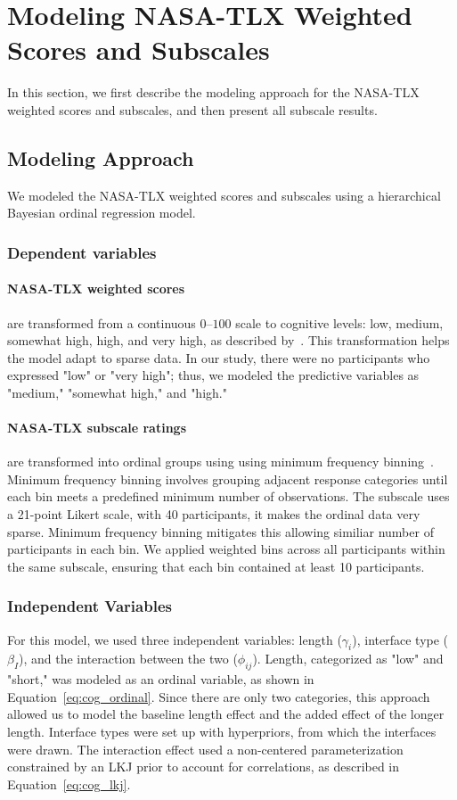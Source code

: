 \section{Modeling NASA-TLX Weighted Scores and Subscales}
In this section, we first describe the modeling approach for the NASA-TLX weighted scores and subscales, and then present all subscale results.

\subsection{Modeling Approach}
We modeled the NASA-TLX weighted scores and subscales using a hierarchical Bayesian ordinal regression model. 

\subsubsection{Dependent variables}
\paragraph{NASA-TLX weighted scores} are transformed from a continuous $0$–$100$ scale to cognitive levels: low, medium, somewhat high, high, and very high, as described by~\textcite{hart1988development}. This transformation helps the model adapt to sparse data. In our study, there were no participants who expressed "low" or "very high"; thus, we modeled the predictive variables as "medium," "somewhat high," and "high."

\paragraph{NASA-TLX subscale ratings} are transformed into ordinal groups using using minimum frequency binning~\cite{frank2001simple}. Minimum frequency binning involves grouping adjacent response categories until each bin meets a predefined minimum number of observations. The subscale uses a 21-point Likert scale, with 40 participants, it makes the ordinal data very sparse. Minimum frequency binning mitigates this allowing similiar number of participants in each bin. We applied weighted bins across all participants within the same subscale, ensuring that each bin contained at least 10 participants.

\subsubsection{Independent Variables}
For this model, we used three independent variables: length ($\gamma_i$), interface type ($\beta_I$), and the interaction between the two ($\phi_{ij}$). Length, categorized as "low" and "short," was modeled as an ordinal variable, as shown in Equation~\ref{eq:cog_ordinal}. Since there are only two categories, this approach allowed us to model the baseline length effect and the added effect of the longer length. Interface types were set up with hyperpriors, from which the interfaces were drawn. The interaction effect used a non-centered parameterization constrained by an LKJ prior to account for correlations, as described in Equation~\ref{eq:cog_lkj}.

